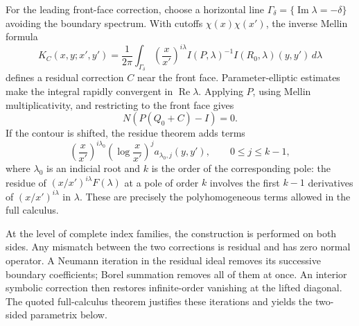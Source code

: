 \documentclass[12pt,oneside,reqno]{article}
\theoremstyle{plain}
\theoremstyle{definition}
\theoremstyle{remark}
\begin{document}
For the leading front-face correction, choose a horizontal line
\(\Gamma_\delta=\{\operatorname{Im}\lambda=-\delta\}\) avoiding the boundary
spectrum. With cutoffs \(\chi(x)\chi(x')\), the inverse Mellin formula
\[
 K_C(x,y;x',y')
 =
 \frac1{2\pi}\int_{\Gamma_\delta}
 \left(\frac{x}{x'}\right)^{i\lambda}
 I(P,\lambda)^{-1}I(R_0,\lambda)(y,y')\,d\lambda
\]
defines a residual correction \(C\) near the front face. Parameter-elliptic
estimates make the integral rapidly convergent in
\(\operatorname{Re}\lambda\). Applying \(P\), using Mellin
multiplicativity, and restricting to the front face gives
\[
 N(P(Q_0+C)-I)=0.
\]
If the contour is shifted, the residue theorem adds terms
\[
 \left(\frac{x}{x'}\right)^{i\lambda_0}
 \left(\log\frac{x}{x'}\right)^j a_{\lambda_0,j}(y,y'),
 \qquad 0\leq j\leq k-1,
\]
where \(\lambda_0\) is an indicial root and \(k\) is the order of the
corresponding pole: the residue of \((x/x')^{i\lambda}F(\lambda)\) at a pole
of order \(k\) involves the first \(k-1\) derivatives of
\((x/x')^{i\lambda}\) in \(\lambda\). These are precisely the
polyhomogeneous terms allowed in the full calculus.

At the level of complete index families, the construction is performed on
both sides. Any mismatch between the two corrections is residual and has
zero normal operator. A Neumann iteration
in the residual ideal removes its successive boundary coefficients; Borel
summation removes all of them at once. An interior symbolic correction then
restores infinite-order vanishing at the lifted diagonal. The quoted
full-calculus theorem justifies these iterations and yields the two-sided
parametrix below.
\end{document}
